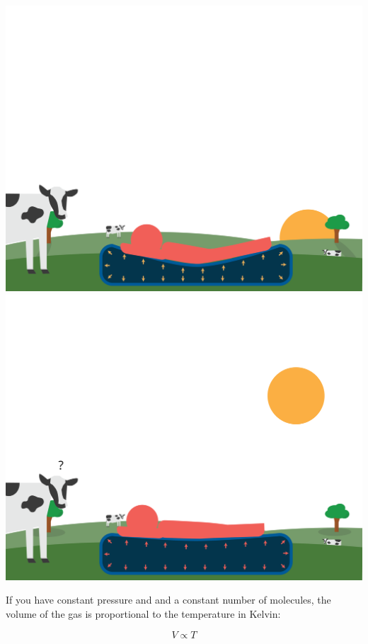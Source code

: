 \includegraphics[width=\textwidth]{airMattress2.png}
\includegraphics[width=\textwidth]{airMattress3.png}


If you have constant pressure and and a constant number of molecules,  the volume of the gas is proportional to the temperature in Kelvin:

$$V \propto T$$

